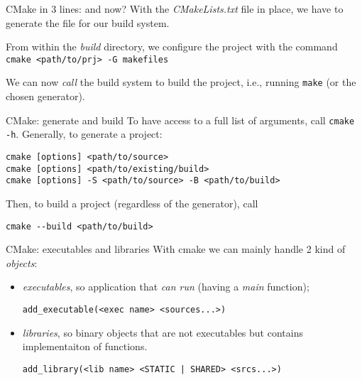 \begin{frame}[fragile]{CMake in 3 lines: and now?}
    With the \textit{CMakeLists.txt} file in place, we have to generate the file for our build system.

    From within the \textit{build} directory, we configure the project with the command\\
    \texttt{cmake <path/to/prj> -G makefiles}

    We can now \emph{call} the build system to build the project, i.e., running \texttt{make} (or the chosen generator).

\end{frame}

\begin{frame}[fragile]{CMake: generate and build}
    To have access to a full list of arguments, call \texttt{cmake -h}. Generally, to generate a project:
\begin{lstlisting}
cmake [options] <path/to/source>
cmake [options] <path/to/existing/build>
cmake [options] -S <path/to/source> -B <path/to/build>
\end{lstlisting}

Then, to build a project (regardless of the generator), call
\begin{lstlisting}
cmake --build <path/to/build>
\end{lstlisting}

\end{frame}


\begin{frame}[fragile]{CMake: executables and libraries}
    With cmake we can mainly handle 2 kind of \textit{objects}:
    \begin{itemize}
        \item \emph{executables}, so application that \textit{can run} (having a \textit{main} function);
            \begin{lstlisting}               
add_executable(<exec name> <sources...>)
\end{lstlisting}
            
        \item \emph{libraries}, so binary objects that are not executables but contains implementaiton of functions.
            \begin{lstlisting}               
add_library(<lib name> <STATIC | SHARED> <srcs...>)
\end{lstlisting}
    \end{itemize}
\end{frame}

